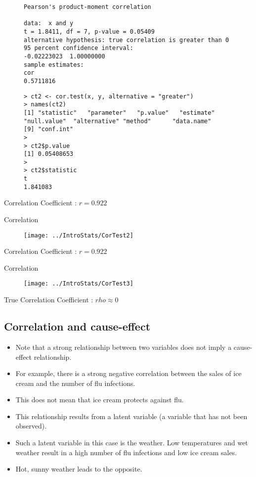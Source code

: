 \begin{figure}
\begin{verbatim}
Pearson's product-moment correlation

data:  x and y
t = 1.8411, df = 7, p-value = 0.05409
alternative hypothesis: true correlation is greater than 0
95 percent confidence interval:
-0.02223023  1.00000000
sample estimates:
cor
0.5711816
\end{verbatim}

\begin{verbatim}
> ct2 <- cor.test(x, y, alternative = "greater")
> names(ct2)
[1] "statistic"   "parameter"   "p.value"   "estimate"  "null.value"  "alternative" "method"      "data.name"
[9] "conf.int"
>
> ct2$p.value
[1] 0.05408653
>
> ct2$statistic
t
1.841083
\end{verbatim}




\end{figure}
{
\Large
Correlation Coefficient : $r = 0.922$
}

{Correlation}
\vspace{-0.5cm}
\begin{figure}
\centering
\texttt{[image: ../IntroStats/CorTest2]}
\end{figure}
{
\Large
Correlation Coefficient : $r = 0.922$
}

{Correlation}
\begin{figure}
\centering
\texttt{[image: ../IntroStats/CorTest3]}
\end{figure}
{
\Large
True Correlation Coefficient : $rho \approx 0$
}



\subsection{Correlation and cause-effect}
\begin{itemize}
\item Note that a strong relationship between two variables does not
imply a cause-effect relationship.
\item For example, there is a strong negative correlation between the
sales of ice cream and the number of flu infections.
\item This does not mean that ice cream protects against flu.
\item This relationship results from a latent variable (a variable that has
not been observed).
\item Such a latent variable in this case is the weather. Low
temperatures and wet weather result in a high number of flu
infections and low ice cream sales. \item Hot, sunny weather leads to the
opposite.
\end{itemize}



